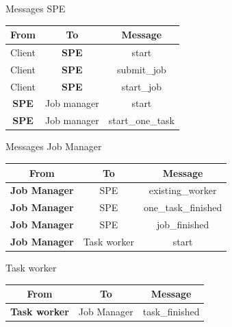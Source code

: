 \documentclass{beamer}
\begin{document}
\begin{frame}{Messages SPE}
    \begin{table}[]
        \centering
        \begin{tabular}{|c|c|c|}
        \hline
        From & To & Message \\
        \hline
        \hline
        \hline
        Client & \textbf{SPE} & start \\
        Client & \textbf{SPE} & submit\_job \\
        Client & \textbf{SPE} &  start\_job \\
        \textbf{SPE} & Job manager & start \\
        \textbf{SPE} & Job manager &  start\_one\_task \\
        \hline
        \end{tabular}
    \end{table}
\end{frame}

\begin{frame}{Messages Job Manager}

    \begin{table}[]
        \centering
        \begin{tabular}{|c|c|c|}
        \hline
        From & To & Message \\
        \hline
        \hline
        \hline
        \textbf{Job Manager} & SPE & existing\_worker \\
        \textbf{Job Manager} & SPE & one\_task\_finished \\
        \textbf{Job Manager} & SPE & job\_finished \\
        \textbf{Job Manager} & Task worker & start \\
        
        \hline
        \end{tabular}
    \end{table}

\end{frame}

\begin{frame}{Task worker}

    \begin{table}[]
        \centering
        \begin{tabular}{|c|c|c|}
        \hline
        From & To & Message \\
        \hline
        \hline
        \hline
        \textbf{Task worker} & Job Manager & task\_finished \\
        \hline
        \end{tabular}
    \end{table}
\end{frame}
\end{document}
